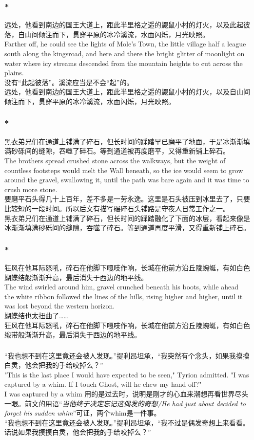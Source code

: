 \documentclass[12pt,a4paper]{article}
\newcommand{\h}[1]{{\color{red}#1}\\}
\newcommand{\la}[1]{{\color{blue}#1}\\}
\begin{document}
\subsubsection{\color{red}*}\la{
	远处，他看到南边的国王大道上，距此半里格之遥的鼹鼠小村的灯火，以及此起彼落，自山间倾注而下，贯穿平原的冰冷溪流，水面闪烁，月光映照。\\
	Farther off, he could see the lights of Mole's Town, the little village half a league south along the kingsroad, and here and there the bright glitter of moonlight on water where icy streams descended from the mountain heights to cut across the plains.}\h{
	没有“此起彼落”。溪流应当是不会“起”的。}
	远处，他看到南边的国王大道上，距此半里格之遥的鼹鼠小村的灯火，以及自山间倾注而下，贯穿平原的冰冷溪流，水面闪烁，月光映照。
	
\subsubsection{\color{red}*}\la{	
			黑衣弟兄们在通道上铺满了碎石，但长时间的踩踏早已磨平了地面，于是冰渐渐填满砂砾间的缝隙，吞噬了碎石。等到通道被再度磨平，又得重新铺上碎石。\\
			The brothers spread crushed stone across the walkways, but the weight of countless footsteps would melt the Wall beneath, so the ice would seem to grow around the gravel, swallowing it, until the path was bare again and it was time to crush more stone. }\h{
			要磨平石头得几十上百年，差不多是一劳永逸。这里是石头被压到冰里去了，只要比较短的一段时间。所以后文有描写碾碎石头铺路是守夜人日常工作之一。}
			黑衣弟兄们在通道上铺满了碎石，但长时间的踩踏融化了下面的冰层，看起来像是冰渐渐填满砂砾间的缝隙，吞噬了碎石。等到通道再度平滑，又得重新铺上碎石。

\subsubsection{\color{red}*}\la{
	狂风在他耳际怒吼，碎石在他脚下嘎吱作响，长城在他前方沿丘陵蜿蜒，有如白色蝴蝶结般渐渐升高，最后消失于西边的地平线。\\
	The wind swirled around him, gravel crunched beneath his boots, while ahead the white ribbon followed the lines of the hills, rising higher and higher, until it was lost beyond the western horizon. }\h{
	蝴蝶结也太扭曲了……}
	狂风在他耳际怒吼，碎石在他脚下嘎吱作响，长城在他前方沿丘陵蜿蜒，有如白色缎带般渐渐升高，最后消失于西边的地平线。
	
\subsubsection{}\la{
	“我也想不到在这里竟还会被人发现。”提利昂坦承，“我突然有个念头，如果我摸摸白灵，他会把我的手给咬掉么？”\\
	"This is the last place I would have expected to be seen," Tyrion admitted. "I was captured by a whim. If I touch Ghost, will he chew my hand off?"}\h{
	I was captured by a whim 用的是过去时，说明是刚才的心血来潮想再看世界尽头一眼。前文的用语“\emph{当他终于决定忘记这偶发的奇想/He had just about decided to forget his sudden whim}”可证，两个whim是一件事。}
	“我也想不到在这里竟还会被人发现。”提利昂坦承，“我不过是偶发奇想上来看看。话说如果我摸摸白灵，他会把我的手给咬掉么？” 
	
\end{document}
